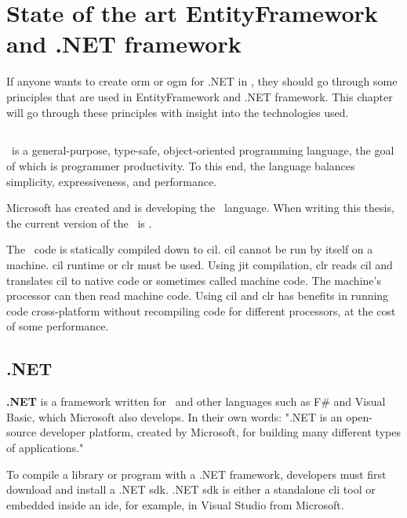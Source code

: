 \chapter {State of the art EntityFramework and .NET framework}

If anyone wants to create \acrshort{orm} or \acrshort{ogm} for .NET in \CS, they should go through some principles that are used in EntityFramework and .NET framework.
This chapter will go through these principles with insight into the technologies used.

\section {\CS}
\CS\ is a general-purpose, type-safe, object-oriented programming language, the goal of which is programmer productivity.
To this end, the language balances simplicity, expressiveness, and performance. \cite{albahari_c_2019}

Microsoft has created and is developing the \CS\ language. When writing this thesis, the current version of the \CS\ is .

The \CS\ code is statically compiled down to \acrlong{cil}. \acrshort{cil} cannot be run by itself on a machine.
\acrshort{cil} runtime or \acrfull{clr} must be used.
Using \acrfull{jit} compilation, \acrshort{clr} reads \acrshort{cil} and translates \acrshort{cil} to native code or sometimes called machine code.
The machine's processor can then read machine code. Using \acrshort{cil} and \acrshort{clr} has benefits in running code cross-platform without recompiling code for different processors, at the cost of some performance. \cite{rodenburg_code_2021}

\section {.NET}

\textbf{.NET} is a framework written for \CS\ and other languages such as F\# and Visual Basic, which Microsoft also develops.
In their own words: ".NET is an open-source developer platform, created by Microsoft, for building many different types of applications." \cite{noauthor_what_nodate-2}

To compile a library or program with a .NET framework, developers must first download and install a .NET \acrfull{sdk}.
.NET \acrfull{sdk} is either a standalone \acrfull{cli} tool or embedded inside an \acrshort{ide}, for example, in Visual Studio from Microsoft.

